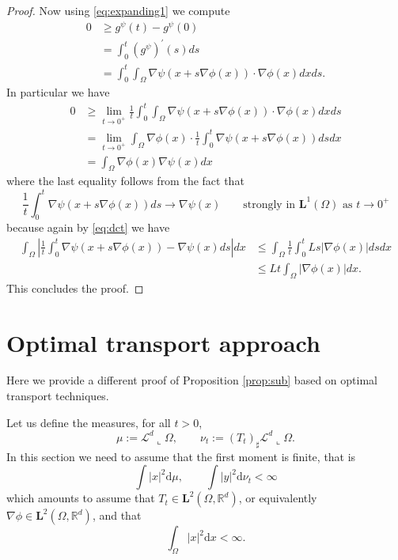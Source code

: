 \documentclass[11pt, twoside, reqno]{amsart}
\newcounter{assu}
\theoremstyle{definition} \newtheorem{definition}{Definition}[section]
\theoremstyle{definition} \newtheorem{remark}[definition]{Remark}
\theoremstyle{plain} \newtheorem{lemma}[definition]{Lemma}
\theoremstyle{plain} \newtheorem{proposition}[definition]{Proposition}
\theoremstyle{plain} \newtheorem{theorem}[definition]{Theorem}
\theoremstyle{plain} \newtheorem{corollary}[definition]{Corollary}
\theoremstyle{definition} \newtheorem{example}[definition]{Example}
\theoremstyle{plain} \newtheorem{claim}[clai]{Claim}
\theoremstyle{definition} \newtheorem{assumption}[definition]{Assumption}
\newcommand{\1}{\mathbbm 1}
\numberwithin{equation}{section} %
\theoremstyle{plain} \newtheorem*{theorem*}{Theorem}
\theoremstyle{plain} \newtheorem{mthm}[maintheorem]{Main Theorem}
\theoremstyle{plain} \newtheorem*{mthm*}{Main Theorem}
\theoremstyle{plain} \newtheorem*{conjecture*}{Conjecture}
\theoremstyle{plain} \newtheorem{conjecture}[definition]{Conjecture}
\theoremstyle{plain} \newtheorem*{problem*}{Problem}
\begin{document}
\begin{proof}
Now using \eqref{eq:expanding1} we compute
$$
\begin{aligned}
    0 & \geq g^\psi(t)-g^\psi(0) \\
    & = \int_0^t(g^\psi)^\prime(s) d s \\
    & = \int_0^t \int_\Omega \nabla \psi(x+ s\nabla \phi(x)) \cdot \nabla \phi(x) d x d s.
\end{aligned}
$$
In particular we have
$$
\begin{aligned}
0 & \geq \lim_{t \to 0^+} \frac{1}{t} \int_0^t  \int_\Omega \nabla \psi(x+ s\nabla \phi(x)) \cdot \nabla \phi(x) d x d s \\
& =\lim_{t \to 0^+} \int_\Omega \nabla \phi(x) \cdot \frac{1}{t} \int_0^t  \nabla \psi(x+ s\nabla \phi(x))  d s d x \\
& = \int_\Omega \nabla \phi(x) \nabla \psi(x) d x
\end{aligned}
$$
where the last equality follows from the fact that 
$$
\frac{1}{t}\int_0^t  \nabla \psi(x+ s\nabla \phi(x))  d s \longrightarrow \nabla \psi(x) \qquad \text{strongly in $\mathbf L^1(\Omega)$ as $t \to 0^+$}
$$
because again by \eqref{eq:dct} we have
$$
\begin{aligned}
     \int_\Omega \left| \frac{1}{t} \int_0^t   \nabla \psi(x+ s\nabla \phi(x))- \nabla \psi(x)  d s\right| d x  & \leq  \int_\Omega \frac{1}{t}\int_0^t L s |\nabla \phi(x)| d s d x\\
     & \leq L t \int_\Omega |\nabla \phi(x)| d x.
\end{aligned}
$$
This concludes the proof.

\end{proof}






\section{Optimal transport approach}\label{sec:optproof}
Here we provide a different proof of Proposition \ref{prop:sub} based on optimal transport techniques.

\vspace{0.3cm}
Let us define the measures, for all $t > 0$,
$$
\mu := \mathscr L^d \llcorner \Omega, \qquad \nu_t := (T_t)_\sharp \mathscr L^d \llcorner \Omega.
$$
In this section we need to assume that the first moment is finite, that is
$$
\int |x|^2 \mathrm{d} \mu, \qquad \int |y|^2 \mathrm{d} \nu_t < \infty
$$
which amounts to assume that $T_t \in \mathbf L^2(\Omega, \mathbb R^d)$, or equivalently $\nabla \phi \in \mathbf L^2(\Omega, \mathbb R^d)$, and that 
$$
\int_{\Omega} |x|^2 \mathrm{d} x < \infty.
$$
\end{document}
